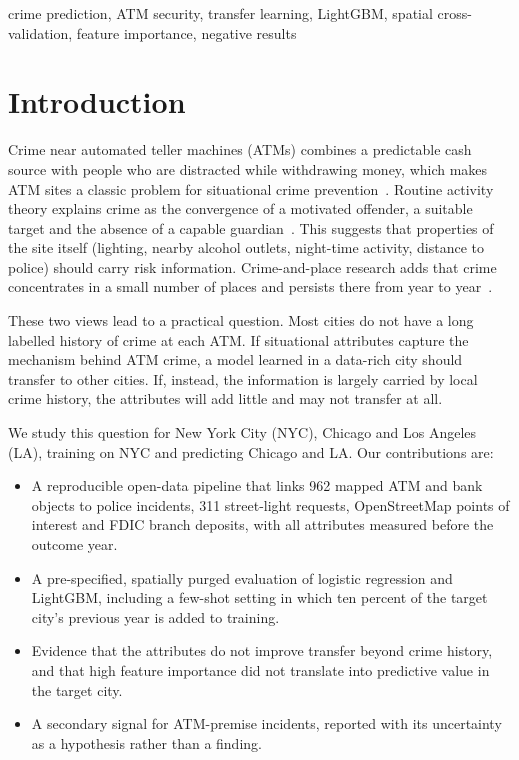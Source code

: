 \documentclass[conference]{IEEEtran}
\begin{document}
\begin{IEEEkeywords}
crime prediction, ATM security, transfer learning, LightGBM, spatial cross-validation, feature importance, negative results
\end{IEEEkeywords}

\section{Introduction}
Crime near automated teller machines (ATMs) combines a predictable cash source with people who are distracted while
withdrawing money, which makes ATM sites a classic problem for situational crime prevention~\cite{scott2001,clarke1999}.
Routine activity theory explains crime as the convergence of a motivated offender, a suitable target and the absence
of a capable guardian~\cite{cohen1979}. This suggests that properties of the site itself (lighting, nearby alcohol
outlets, night-time activity, distance to police) should carry risk information. Crime-and-place research adds that
crime concentrates in a small number of places and persists there from year to year~\cite{weisburd2015,johnson2004}.

These two views lead to a practical question. Most cities do not have a long labelled history of crime at each ATM.
If situational attributes capture the mechanism behind ATM crime, a model learned in a data-rich city should
transfer to other cities. If, instead, the information is largely carried by local crime history, the attributes
will add little and may not transfer at all.

We study this question for New York City (NYC), Chicago and Los Angeles (LA), training on NYC and predicting
Chicago and LA. Our contributions are:
\begin{itemize}
\item A reproducible open-data pipeline that links 962 mapped ATM and bank objects to police incidents, 311
street-light requests, OpenStreetMap points of interest and FDIC branch deposits, with all attributes measured
before the outcome year.
\item A pre-specified, spatially purged evaluation of logistic regression and LightGBM, including a few-shot setting
in which ten percent of the target city's previous year is added to training.
\item Evidence that the attributes do not improve transfer beyond crime history, and that high feature importance
did not translate into predictive value in the target city.
\item A secondary signal for ATM-premise incidents, reported with its uncertainty as a hypothesis rather than a finding.
\end{itemize}
\end{document}
